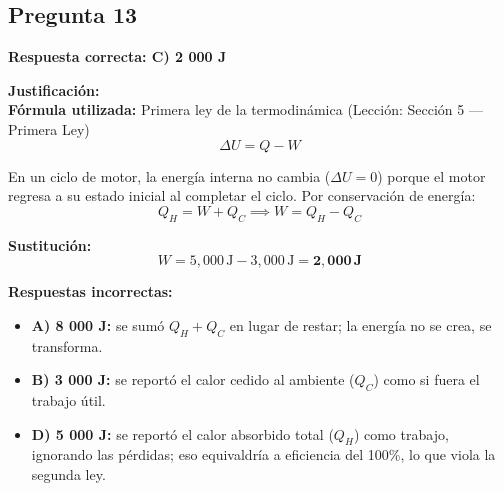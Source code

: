 \begin{respuestabox}
\subsection{Pregunta 13}
\textcolor{verdecorrecto}{\textbf{Respuesta correcta: C) 2 000 J}}

\textbf{Justificación:}\\
\textbf{Fórmula utilizada:} Primera ley de la termodinámica (Lección: Sección 5 --- Primera Ley)
$$\Delta U = Q - W$$

En un ciclo de motor, la energía interna no cambia ($\Delta U = 0$) porque el motor regresa a su estado inicial al completar el ciclo. Por conservación de energía:
$$Q_H = W + Q_C \implies W = Q_H - Q_C$$

\textbf{Sustitución:}
$$W = 5{,}000\,\text{J} - 3{,}000\,\text{J} = \mathbf{2{,}000\,\text{J}}$$

\textbf{Respuestas incorrectas:}
\begin{itemize}
    \item \textbf{A) 8 000 J:} se sumó $Q_H + Q_C$ en lugar de restar; la energía no se crea, se transforma.
    \item \textbf{B) 3 000 J:} se reportó el calor cedido al ambiente ($Q_C$) como si fuera el trabajo útil.
    \item \textbf{D) 5 000 J:} se reportó el calor absorbido total ($Q_H$) como trabajo, ignorando las pérdidas; eso equivaldría a eficiencia del 100\%, lo que viola la segunda ley.
\end{itemize}
\end{respuestabox}

